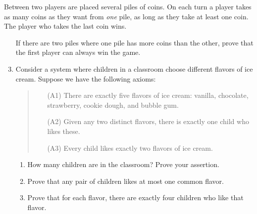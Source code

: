 \begin{exercises}{}{}
	\exstart Between two players are placed several piles of coins. On each turn a player takes as many coins as they want from \emph{one} pile, as long as they take at least one coin. The player who takes the last coin wins.
	
	\begin{enumerate}\setcounter{enumi}{1}
	  \item[]If there are two piles where one pile has more coins than the other, prove that the first player can always win the game.
	  \item Consider a system where children in a classroom choose different flavors of ice cream. Suppose we have the following axioms:
	  \begin{quote}
	  \begin{itemize}%
	  	\item[(A1)] There are exactly five flavors of ice cream: vanilla, chocolate, strawberry, cookie dough, and bubble gum.
	  	\item[(A2)] Given any two distinct flavors, there is exactly one child who likes these.
	  	\item[(A3)] Every child likes exactly two flavors of ice cream.
	  \end{itemize}
	  \end{quote}
	  \begin{enumerate}
	    \item How many children are in the classroom? Prove your assertion.
	    \item Prove that any pair of children likes at most one common flavor.
	    \item Prove that for each flavor, there are exactly four children who like that flavor.
		\end{enumerate}
		
	

\end{enumerate}
\end{exercises}
